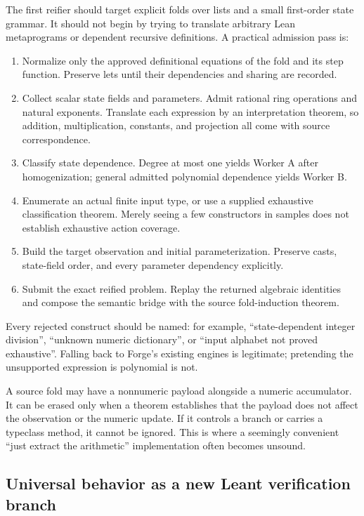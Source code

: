 The first reifier should target explicit folds over lists and a small first-order
state grammar. It should not begin by trying to translate arbitrary Lean
metaprograms or dependent recursive definitions. A practical admission pass is:

\begin{enumerate}
\item Normalize only the approved definitional equations of the fold and its
step function. Preserve lets until their dependencies and sharing are recorded.
\item Collect scalar state fields and parameters. Admit rational ring operations
and natural exponents. Translate each expression by an interpretation theorem,
so addition, multiplication, constants, and projection all come with source
correspondence.
\item Classify state dependence. Degree at most one yields Worker A after
homogenization; general admitted polynomial dependence yields Worker B.
\item Enumerate an actual finite input type, or use a supplied exhaustive
classification theorem. Merely seeing a few constructors in samples does not
establish exhaustive action coverage.
\item Build the target observation and initial parameterization. Preserve casts,
state-field order, and every parameter dependency explicitly.
\item Submit the exact reified problem. Replay the returned algebraic identities
and compose the semantic bridge with the source fold-induction theorem.
\end{enumerate}

Every rejected construct should be named: for example, ``state-dependent
integer division'', ``unknown numeric dictionary'', or ``input alphabet not
proved exhaustive''. Falling back to Forge's existing engines is legitimate;
pretending the unsupported expression is polynomial is not.

A source fold may have a nonnumeric payload alongside a numeric accumulator.
It can be erased only when a theorem establishes that the payload does not
affect the observation or the numeric update. If it controls a branch or carries
a typeclass method, it cannot be ignored. This is where a seemingly convenient
``just extract the arithmetic'' implementation often becomes unsound.

\subsection{Universal behavior as a new Leant verification branch}

